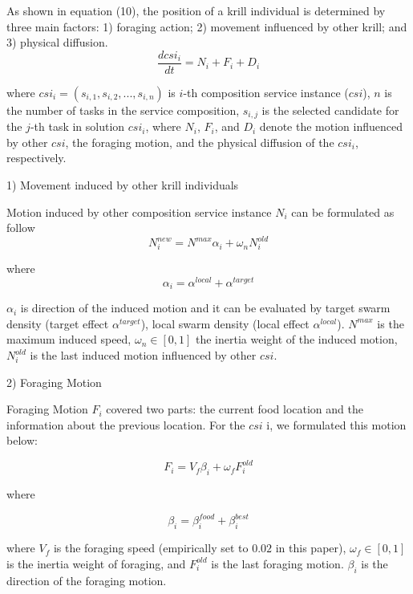\documentclass[10pt,journal,compsoc]{IEEEtran}
\begin{document}
As shown in equation (10), the position of a krill individual is determined by three main factors: 1) foraging action; 2) movement influenced by other krill; and 3) physical diffusion. 
\begin{equation}
\frac{dcsi_i}{dt} =N_i+F_i+D_i
\end{equation}

where $csi_i = (s_{i,1}, s_{i,2}, . . . , s_{i,n})$ is $i$-th composition service instance ($csi$), $n$ is the number of tasks in the service composition, $s_{i,j}$ is the selected candidate for the $j$-th task in solution $csi_i$, where $N_i$, $F_i$, and $D_i$ denote the motion influenced by other $csi$, the foraging motion, and the physical diffusion of the $csi_i$, respectively.

1) Movement induced by other krill individuals

Motion induced by other composition service instance $N_i$ can be formulated as follow
\begin{equation}
N^{new}_i = N^{max}\alpha_i + \omega_n N^{old}_i
\end{equation}

where
\begin{equation}
\alpha_i = \alpha^{local}+\alpha^{target}
\end{equation}

$\alpha_i$ is direction of the induced motion and it can be evaluated by target swarm density (target effect $\alpha^{target}$), local swarm density (local effect $\alpha^{local}$). $N^{max}$ is the maximum induced speed, $\omega_n \in [0, 1]$ the inertia weight of the induced motion, $N^{old}_{i}$ is the last induced motion influenced by other $csi$.

2) Foraging Motion

Foraging Motion $F_i$ covered two parts: the current food location and the information about the previous location. For the $csi$ i, we formulated this motion below:

\begin{equation}
F_i = V_f\beta_i + \omega_f F^{old}_i
\end{equation}

where

\begin{equation}
\beta_i = \beta_i^{food}+\beta_i^{best}
\end{equation}

where $V_f$ is the foraging speed (empirically set to $0.02$ in this paper), $\omega_f∈ [0, 1]$ is the inertia weight of foraging, and $F^{old}_i$ is the last foraging motion. $\beta_i$ is the direction of the foraging motion.
\end{document}
